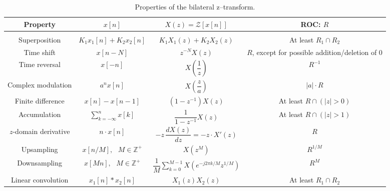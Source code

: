 \documentclass{report}
\begin{document}
\begin{table}[hbt!]
    \centering
    \caption{Properties of the bilateral z--transform.}
    \label{z_prop}
    \begin{tabular}{|c|c|c|c|}
        \hline
        Property & $x[n]$ & $X(z)=\mathcal{Z}[x[n]]$ & ROC: $R$ \\[0.15cm]
        \hline
        & & & \\
        Superposition & $K_1x_1[n]+K_2x_2[n]$ & $K_1X_1(z)+K_2X_2(z)$ & At least $R_1\cap R_2$ \\[0.5cm]
        Time shift & $x[n-N]$ & $z^{-N}X(z)$ & \shortstack{$R$, except for possible \\ addition/deletion of 0} \\[0.5cm]
        Time reversal & $x[-n]$ & $X\left(\dfrac{1}{z}\right)$ & $R^{-1}$ \\[0.5cm]
        Complex modulation & $a^n x[n]$ & $X\left(\dfrac{z}{a}\right)$ & $|a|\cdot R$ \\[0.5cm]
        Finite difference & $x[n]-x[n-1]$ & $(1-z^{-1})X(z)$ & At least $R\cap(|z|>0)$ \\[0.5cm]
        Accumulation & $\displaystyle\sum_{k=-\infty}^{n} x[k]$ & $\dfrac{1}{1-z^{-1}} X(z)$ & At least $R\cap(|z|>1)$ \\[0.5cm]
        $z$-domain derivative & $n\cdot x[n]$ & $-z\,\dfrac{dX(z)}{dz} = -z\cdot X'(z)$ & $R$ \\[0.5cm]
        Upsampling & $x[n/M],\text{ } M\in\mathbb{Z}^+$ & $X(z^M)$ & $R^{1/M}$ \\[0.5cm]
        Downsampling & $x[Mn],\text{ } M\in\mathbb{Z}^+$ & $\dfrac{1}{M}\displaystyle\sum_{k=0}^{M-1}X(e^{-j2\pi k/M}z^{1/M})$ & $R^M$ \\[0.5cm]
        Linear convolution & $x_1[n]*x_2[n]$ & $X_1(z)X_2(z)$ & At least $R_1\cap R_2$ \\[0.5cm]
        \hline
    \end{tabular}
\end{table}
\end{document}
